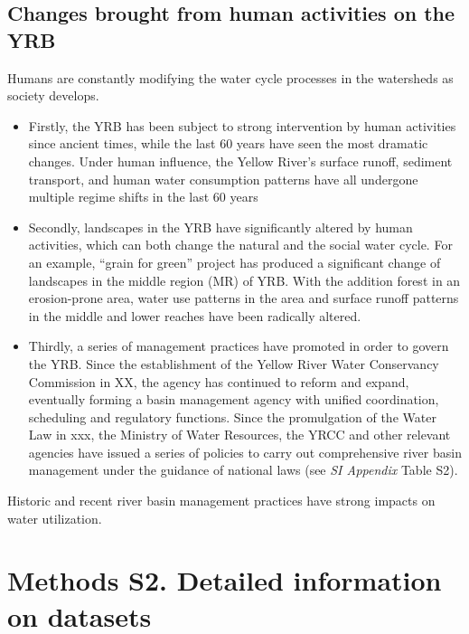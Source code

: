\documentclass[9pt,twoside,lineno]{pnas-new}
\begin{document}

\subsection*{Changes brought from human activities on the YRB}
Humans are constantly modifying the water cycle processes in the watersheds as society develops.
\begin{itemize}
    \item Firstly, the YRB has been subject to strong intervention by human activities since ancient times, while the last 60 years have seen the most dramatic changes. Under human influence, the Yellow River's surface runoff, sediment transport, and human water consumption patterns have all undergone multiple regime shifts in the last 60 years
    \item Secondly, landscapes in the YRB have significantly altered by human activities, which can both change the natural and the social water cycle. For an example, “grain for green” project has produced a significant change of landscapes in the middle region (MR) of YRB. With the addition forest in an erosion-prone area, water use patterns in the area and surface runoff patterns in the middle and lower reaches have been radically altered.
    \item Thirdly, a series of management practices have promoted in order to govern the YRB. Since the establishment of the Yellow River Water Conservancy Commission in XX, the agency has continued to reform and expand, eventually forming a basin management agency with unified coordination, scheduling and regulatory functions. Since the promulgation of the Water Law in xxx, the Ministry of Water Resources, the YRCC and other relevant agencies have issued a series of policies to carry out comprehensive river basin management under the guidance of national laws (see \textit{SI Appendix} Table S2).
\end{itemize}
Historic and recent river basin management practices have strong impacts on water utilization.


\newpage
\section*{Methods S2. Detailed information on datasets}
\end{document}
